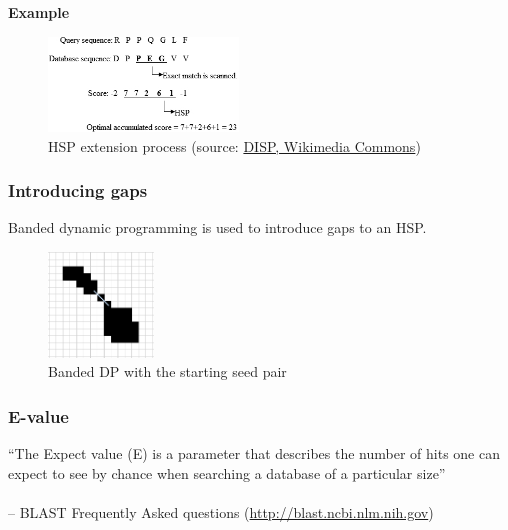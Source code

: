 \noindent
\textbf{Example}
\begin{figure}[H]
  \centering
      \includegraphics[width=0.45\textwidth]{fig05/extension_process.png}
  \caption{HSP extension process (source: \href{https://commons.wikimedia.org/w/index.php?curid=32912508}{DISP, Wikimedia Commons})}
\end{figure}

%
%
\subsubsection*{Introducing gaps} 
Banded dynamic programming is used to introduce gaps to an HSP.

\begin{figure}[H]
  \centering
      \includegraphics[width=0.25\textwidth]{fig05/banded_dp.png}
  \caption{Banded DP with the starting seed pair}
\end{figure}

%
%
\subsubsection*{E-value} 
``The Expect value (E) is a parameter that describes the number of hits one can expect to see by chance when searching a database of a particular size'' \\ \\
-- BLAST Frequently Asked questions (\href{http://blast.ncbi.nlm.nih.gov}{http://blast.ncbi.nlm.nih.gov})

\bigskip 

%
